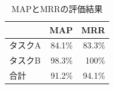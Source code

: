 \documentclass[12pt]{jarticle} %
\begin{document}

\begin{table}[h]
\caption{MAPとMRRの評価結果}
\label{map}
\begin{center}
\begin{tabular}{|p{3cm}|p{3cm}|p{3cm}|}
\hline \hline
\multicolumn{1}{|r|}{} & \multicolumn{1}{p{3cm}|}{MAP} & \multicolumn{1}{p{3cm}|}{MRR} \\ \hline
タスクA & \multicolumn{1}{r|}{84.1\%} & \multicolumn{1}{r|}{83.3\%} \\ \hline
タスクB & \multicolumn{1}{r|}{98.3\%} & \multicolumn{1}{r|}{100\%} \\ \hline
合計 & \multicolumn{1}{r|}{91.2\%} & \multicolumn{1}{r|}{94.1\%} \\ \hline
\end{tabular}
\end{center}
\end{table}
\end{document}
